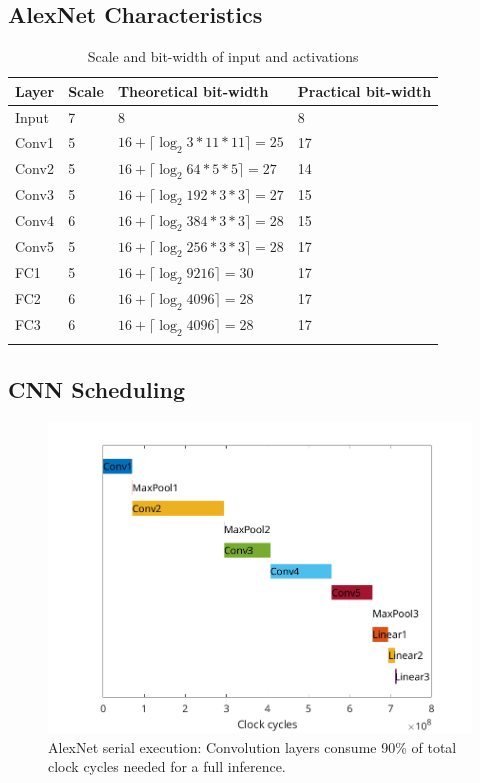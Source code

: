 \subsection{AlexNet Characteristics}
\begin{table}[H]
	\caption{Scale and bit-width of input and activations}
	\label{tab:scale-and-bit-width-of-input-and-activations}
	\centering
	\begin{tabular}{llll}
		\toprule
		\textbf{Layer} & \textbf{Scale} & \textbf{Theoretical bit-width} & \textbf{Practical bit-width}\\
		\midrule
			Input & 7 & 8 & 8\\
			Conv1 & 5 & $16 + \lceil \log_2 3 * 11 * 11 \rceil = 25 $ & 17\\
			Conv2 & 5 & $16 + \lceil \log_2 64 * 5 * 5 \rceil = 27$ & 14\\
			Conv3 & 5 & $16 + \lceil \log_2 192 * 3 * 3 \rceil = 27$ & 15\\
			Conv4 & 6 & $16 + \lceil \log_2 384 * 3 * 3 \rceil = 28$ & 15\\
			Conv5 & 5 & $16 + \lceil \log_2 256 * 3 * 3 \rceil = 28$ & 17\\
			FC1 & 5 & $16 + \lceil \log_2 9216 \rceil = 30$ & 17\\
			FC2 & 6 & $16 + \lceil \log_2 4096 \rceil = 28$ & 17\\
			FC3 & 6 & $16 + \lceil \log_2 4096 \rceil = 28$ & 17\\
		\bottomrule\\
	\end{tabular}
\end{table}

\subsection{CNN Scheduling}
\label{sec:CNN-Scheduling}
\begin{figure} [H]
	\centering
	\includegraphics[width=\textwidth]{Images/Scheduling/Serial.png}
	\decoRule
	\caption[AlexNet serial execution]{AlexNet serial execution: Convolution layers consume 90\% of total clock cycles needed for a full inference.}
	\label{fig:ZCU102-board-overview}
\end{figure}

